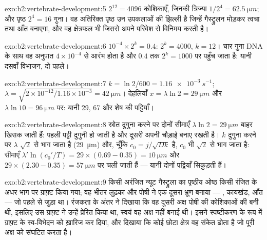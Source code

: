 \begin{solution}{exo:b2:vertebrate-development:5}
$2^{12} = 4096$ कोशिकाएँ, जिनकी त्रिज्या $1/2^{4} = \qty{62.5}{\micro m}$;
और पृष्ठ $2^{4} = 16$ गुना। वह अतिरिक्त पृष्ठ उन उपकलाओं की
झिल्ली है जिन्हें गैस्ट्रुलन मोड़कर त्वचा तथा आँत बनाएगा, और वह
क्षेत्रफल भी जिससे  अपने परिवेश से विनिमय करती है।
\end{solution}

\begin{solution}{exo:b2:vertebrate-development:6}
$10^{-4}\times 2^{k} = 0.4$: $2^{k} = 4000$, $k = 12$। चार गुना
DNA के साथ वह अनुपात $4\times 10^{-4}$ से आरंभ होता है और $0.4$ तक
$2^{k} = 1000$ पर पहुँच जाता है: यानी दसवाँ विभाजन, दो पहले।
\end{solution}

\begin{solution}{exo:b2:vertebrate-development:7}
$k = \ln 2/600 = \qty{1.16e-3}{s^{-1}}$; $\lambda = \sqrt{2\times
10^{-12}/1.16\times 10^{-3}} = \qty{42}{\micro m}$। देहलियाँ
$x = \lambda\ln 2 = \qty{29}{\micro m}$ और $\lambda\ln 10 =
\qty{96}{\micro m}$ पर: यानी 29, 67 और शेष की पट्टियाँ।
\end{solution}

\begin{solution}{exo:b2:vertebrate-development:8}
स्रोत दुगुना करने पर दोनों सीमाएँ $\lambda\ln
2 = \qty{29}{\micro m}$ बाहर खिसक जाती हैं: पहली पट्टी दुगुनी हो जाती है
और दूसरी अपनी चौड़ाई बनाए रखती है। $k$ दुगुना करने पर $\lambda$ $\sqrt 2$
से भाग जाता है (\qty{29}{\micro m}) और, चूँकि $c_0 = j/\sqrt{Dk}$ है,
$c_0$ भी $\sqrt 2$ से भाग जाता है: सीमाएँ $\lambda'\ln(c_0'/T) =
29\times(0.69 - 0.35) = \qty{10}{\micro m}$ और $29\times(2.30 -
0.35) = \qty{57}{\micro m}$ पर चली जाती हैं --- यानी दोनों पट्टियाँ सिकुड़ती हैं।
\end{solution}

\begin{solution}{exo:b2:vertebrate-development:9}
किसी अरंजित न्यूट गैस्ट्रुला का पृष्ठीय ओष्ठ किसी रंजित के
अधर भाग पर ग्राफ़्ट किया गया; वह भीतर लुढ़का और पोषी ने एक
दूसरा भ्रूण बनाया --- , कायखंड, आँत --- जो पहले से जुड़ा था।
रंजकता के अंतर ने दिखाया कि वह दूसरी अक्ष पोषी की कोशिकाओं की
बनी थी, इसलिए उस ग्राफ़्ट ने उन्हें प्रेरित किया था, स्वयं वह अक्ष नहीं
बनाई थी। इसने स्पष्टीकरण के रूप में ग्राफ़्ट के स्व-विभेदन को ख़ारिज
कर दिया, और दिखाया कि कोई छोटा क्षेत्र वह संकेत ढोता है जो पूरी अक्ष
को संघटित करता है।
\end{solution}

